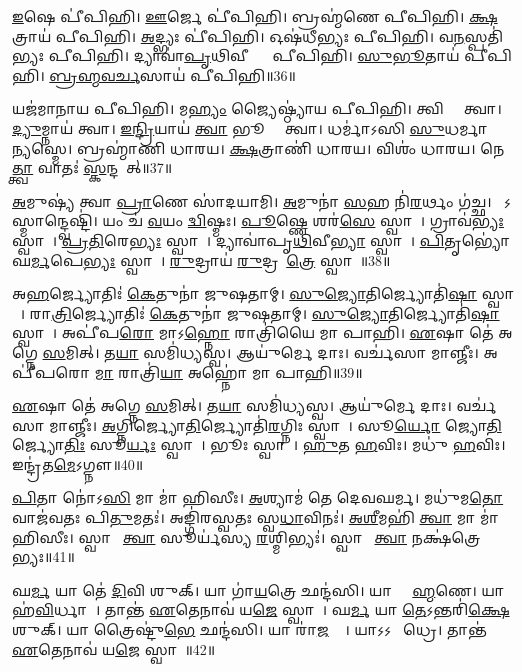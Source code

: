 \ul{𑌇}𑌷𑍇 𑌪𑍀॑𑌪𑌿𑌹𑌿। 
\ul{𑌊}𑌰𑍍𑌜𑍇 𑌪𑍀॑𑌪𑌿𑌹𑌿। 
𑌬𑍍𑌰𑌹𑍍𑌮॑𑌣𑍇 𑌪𑍀𑌪𑌿𑌹𑌿। 
\ul{𑌕𑍍𑌷}𑌤𑍍𑌰𑌾𑌯॑ 𑌪𑍀𑌪𑌿𑌹𑌿। 
\ul{𑌅}𑌦𑍍𑌭𑍍𑌯𑌃 𑌪𑍀॑𑌪𑌿𑌹𑌿। 
𑌓𑌷॑𑌧𑍀𑌭𑍍𑌯𑌃 𑌪𑍀𑌪𑌿𑌹𑌿। 
𑌵\ul{𑌨}𑌸𑍍𑌪𑌤𑌿॑𑌭𑍍𑌯𑌃 𑌪𑍀𑌪𑌿𑌹𑌿। 
𑌦𑍍𑌯𑌾𑌵𑌾॑\ul{𑌪𑍃}𑌥𑌿𑌵𑍀𑌭𑍍𑌯𑌾𑌂᳚ 𑌪𑍀𑌪𑌿𑌹𑌿। 
\ul{𑌸𑍁}\ul{𑌭𑍂}𑌤𑌾𑌯॑ 𑌪𑍀𑌪𑌿𑌹𑌿। 
\ul{𑌬𑍍𑌰}\ul{𑌹𑍍𑌮}\ul{𑌵}\ul{𑌰𑍍𑌚}𑌸𑌾𑌯॑ 𑌪𑍀𑌪𑌿𑌹𑌿॥36॥

𑌯𑌜॑𑌮𑌾𑌨𑌾𑌯 𑌪𑍀𑌪𑌿𑌹𑌿। 
𑌮\ul{𑌹𑍍𑌯𑌂} 𑌜𑍍𑌯𑍈𑌷𑍍𑌠𑍍𑌯𑌾॑𑌯 𑌪𑍀𑌪𑌿𑌹𑌿। 
𑌤𑍍𑌵𑌿𑌷𑍍𑌯𑍈᳚ 𑌤𑍍𑌵𑌾। 
\ul{𑌦𑍍𑌯𑍁}𑌮𑍍𑌨𑌾𑌯॑ 𑌤𑍍𑌵𑌾। 
\ul{𑌇}\ul{𑌨𑍍𑌦𑍍𑌰𑌿}𑌯𑌾𑌯॑ \ul{𑌤𑍍𑌵𑌾} 𑌭𑍂𑌤𑍍𑌯𑍈᳚ 𑌤𑍍𑌵𑌾। 
𑌧𑌰𑍍𑌮𑌾॑𑌽𑌸𑌿 \ul{𑌸𑍁}𑌧𑌰𑍍𑌮𑌾 𑌮𑍇᳚ \ul{𑌨𑍍𑌯}𑌸𑍍𑌮𑍇। 
𑌬𑍍𑌰𑌹𑍍𑌮𑌾॑𑌣𑌿 𑌧𑌾𑌰𑌯। 
\ul{𑌕𑍍𑌷}𑌤𑍍𑌰𑌾𑌣𑌿॑ 𑌧𑌾𑌰𑌯। 
𑌵𑌿𑌶𑌂॑ 𑌧𑌾𑌰𑌯। 
𑌨𑍇\ul{𑌤𑍍𑌤𑍍𑌵𑌾} 𑌵𑌾𑌤𑌃॑ \ul{𑌸𑍍𑌕}𑌨𑍍𑌦𑌯𑌾᳚𑌤𑍍॥37॥

\ul{𑌅}𑌮𑍁𑌷𑍍𑌯॑ 𑌤𑍍𑌵𑌾 \ul{𑌪𑍍𑌰𑌾}𑌣𑍇 𑌸𑌾॑𑌦𑌯𑌾𑌮𑌿। 
\ul{𑌅}𑌮𑍁𑌨𑌾॑ \ul{𑌸}𑌹 𑌨𑌿॑\ul{𑌰}𑌰𑍍𑌥𑌂 𑌗॑𑌚𑍍𑌛। 
𑌯𑍋᳚𑌽𑌸𑍍𑌮𑌾𑌨𑍍𑌦𑍍𑌵𑍇𑌷𑍍𑌟𑌿॑। 
𑌯𑌂 𑌚॑ \ul{𑌵}𑌯𑌂 \ul{𑌦𑍍𑌵𑌿}𑌷𑍍𑌮𑌃। 
\ul{𑌪𑍂}𑌷𑍍𑌣𑍇 𑌶𑌰॑\ul{𑌸𑍇} 𑌸𑍍𑌵𑌾𑌹𑌾᳚। 
𑌗𑍍𑌰𑌾𑌵॑\ul{𑌭𑍍𑌯𑌃} 𑌸𑍍𑌵𑌾𑌹𑌾᳚। 
\ul{𑌪𑍍𑌰}\ul{𑌤𑌿}𑌰𑍇\ul{𑌭𑍍𑌯𑌃} 𑌸𑍍𑌵𑌾𑌹𑌾᳚। 
𑌦𑍍𑌯𑌾𑌵𑌾॑𑌪𑍃\ul{𑌥𑌿}𑌵𑍀\ul{𑌭𑍍𑌯𑌾}\ul{} 𑌸𑍍𑌵𑌾𑌹𑌾᳚। 
\ul{𑌪𑌿}𑌤𑍃𑌭𑍍𑌯𑍋॑ 𑌘\ul{𑌰𑍍𑌮}𑌪𑍇\ul{𑌭𑍍𑌯𑌃} 𑌸𑍍𑌵𑌾𑌹𑌾᳚। 
\ul{𑌰𑍁}𑌦𑍍𑌰𑌾𑌯॑ \ul{𑌰𑍁}𑌦𑍍𑌰𑌹𑍋᳚\ul{𑌤𑍍𑌰𑍇} 𑌸𑍍𑌵𑌾𑌹𑌾᳚॥38॥

𑌅\ul{𑌹}𑌰𑍍𑌜𑍍𑌯𑍋𑌤𑌿𑌃॑ \ul{𑌕𑍇}𑌤𑍁𑌨𑌾॑ 𑌜𑍁𑌷𑌤𑌾𑌮𑍍। 
\ul{𑌸𑍁}\ul{𑌜𑍍𑌯𑍋}𑌤𑌿𑌰𑍍𑌜𑍍𑌯𑍋𑌤𑌿॑\ul{𑌷𑌾}\ul{} 𑌸𑍍𑌵𑌾𑌹𑌾᳚। 
𑌰𑌾\ul{𑌤𑍍𑌰𑌿}𑌰𑍍𑌜𑍍𑌯𑍋𑌤𑌿𑌃॑ \ul{𑌕𑍇}𑌤𑍁𑌨𑌾॑ 𑌜𑍁𑌷𑌤𑌾𑌮𑍍। 
\ul{𑌸𑍁}\ul{𑌜𑍍𑌯𑍋}𑌤𑌿𑌰𑍍𑌜𑍍𑌯𑍋𑌤𑌿॑\ul{𑌷𑌾}\ul{} 𑌸𑍍𑌵𑌾𑌹𑌾᳚। 
𑌅𑌪𑍀॑𑌪\ul{𑌰𑍋} 𑌮𑌾𑌽\ul{𑌹𑍍𑌨𑍋} 𑌰𑌾𑌤𑍍𑌰𑌿॑𑌯𑍈 𑌮𑌾 𑌪𑌾𑌹𑌿। 
\ul{𑌏}𑌷𑌾 𑌤𑍇॑ 𑌅𑌗𑍍𑌨𑍇 \ul{𑌸}𑌮𑌿𑌤𑍍। 
𑌤\ul{𑌯𑌾} 𑌸𑌮𑌿॑𑌧𑍍𑌯𑌸𑍍𑌵। 
𑌆𑌯𑍁॑𑌰𑍍𑌮𑍇 𑌦𑌾𑌃। 
𑌵𑌰𑍍𑌚॑𑌸𑌾 𑌮𑌾𑌞𑍍𑌜𑍀𑌃। 
𑌅𑌪𑍀॑𑌪𑌰𑍋 \ul{𑌮𑌾} 𑌰𑌾𑌤𑍍𑌰𑌿॑\ul{𑌯𑌾} 𑌅𑌹𑍍𑌨𑍋॑ 𑌮𑌾 𑌪𑌾𑌹𑌿॥39॥

\ul{𑌏}𑌷𑌾 𑌤𑍇॑ 𑌅𑌗𑍍𑌨𑍇 \ul{𑌸}𑌮𑌿𑌤𑍍। 
𑌤\ul{𑌯𑌾} 𑌸𑌮𑌿॑𑌧𑍍𑌯𑌸𑍍𑌵। 
𑌆𑌯𑍁॑𑌰𑍍𑌮𑍇 𑌦𑌾𑌃। 
𑌵𑌰𑍍𑌚॑𑌸𑌾 𑌮𑌾𑌞𑍍𑌜𑍀𑌃। 
\ul{𑌅}𑌗𑍍𑌨𑌿𑌰𑍍𑌜𑍍𑌯𑍋\ul{𑌤𑌿}𑌰𑍍𑌜𑍍𑌯𑍋𑌤𑌿॑\ul{𑌰}𑌗𑍍𑌨𑌿𑌃 𑌸𑍍𑌵𑌾𑌹𑌾᳚। 
𑌸𑍂\ul{𑌰𑍍𑌯𑍋} 𑌜𑍍𑌯𑍋\ul{𑌤𑌿}𑌰𑍍𑌜𑍍𑌯𑍋\ul{𑌤𑌿𑌃} 𑌸𑍂\ul{𑌰𑍍𑌯𑌃} 𑌸𑍍𑌵𑌾𑌹𑌾᳚। 
𑌭𑍂𑌃 𑌸𑍍𑌵𑌾𑌹𑌾᳚। 
\ul{𑌹𑍁}𑌤 \ul{𑌹}𑌵𑌿𑌃। 
𑌮𑌧𑍁॑ \ul{𑌹}𑌵𑌿𑌃। 
𑌇𑌨𑍍𑌦𑍍𑌰॑𑌤\ul{𑌮𑍇}𑌽𑌗𑍍𑌨𑍗॥40॥

\ul{𑌪𑌿}𑌤𑌾 𑌨𑍋॑𑌽\ul{𑌸𑌿} 𑌮𑌾 𑌮𑌾॑ 𑌹𑌿𑌸𑍀𑌃। 
\ul{𑌅}𑌶𑍍𑌯𑌾𑌮॑ 𑌤𑍇 𑌦𑍇𑌵𑌘𑌰𑍍𑌮। 
𑌮𑌧𑍁॑𑌮\ul{𑌤𑍋} 𑌵𑌾𑌜॑𑌵𑌤𑌃 𑌪𑌿\ul{𑌤𑍁}𑌮𑌤𑌃॑। 
𑌅𑌙𑍍𑌗𑌿॑𑌰𑌸𑍍𑌵𑌤𑌃 𑌸𑍍𑌵\ul{𑌧𑌾}𑌵𑌿𑌨𑌃॑। 
\ul{𑌅}\ul{𑌶𑍀}𑌮𑌹𑌿॑ \ul{𑌤𑍍𑌵𑌾} 𑌮𑌾 𑌮𑌾॑ 𑌹𑌿𑌸𑍀𑌃। 
𑌸𑍍𑌵𑌾𑌹𑌾᳚ \ul{𑌤𑍍𑌵𑌾} 𑌸𑍂𑌰𑍍𑌯॑𑌸𑍍𑌯 \ul{𑌰}𑌶𑍍𑌮𑌿𑌭𑍍𑌯𑌃॑। 
𑌸𑍍𑌵𑌾𑌹𑌾᳚ \ul{𑌤𑍍𑌵𑌾} 𑌨𑌕𑍍𑌷॑𑌤𑍍𑌰𑍇𑌭𑍍𑌯𑌃॥41॥
\anuvakamend[\ul{𑌬𑍍𑌰}\ul{𑌹𑍍𑌮}\ul{𑌵}\ul{𑌰𑍍𑌚}𑌸𑌾𑌯॑ 𑌪𑍀𑌪𑌿𑌹𑌿 \ul{𑌸𑍍𑌕}𑌨𑍍𑌦𑌯𑌾᳚\ul{𑌦𑍍𑌰𑍁}𑌦𑍍𑌰𑌾𑌯॑ \ul{𑌰𑍁}𑌦𑍍𑌰𑌹𑍋᳚\ul{𑌤𑍍𑌰𑍇} 𑌸𑍍𑌵𑌾𑌹𑌾𑌽𑌹𑍍𑌨𑍋॑ 𑌮𑌾 𑌪𑌾\ul{𑌹𑍍𑌯}𑌗𑍍𑌨𑍗 \ul{𑌸}𑌪𑍍𑌤 𑌚॑]

𑌘\ul{𑌰𑍍𑌮} 𑌯𑌾 𑌤𑍇॑ \ul{𑌦𑌿}𑌵𑌿 𑌶𑍁𑌕𑍍। 
𑌯𑌾 𑌗𑌾॑\ul{𑌯}𑌤𑍍𑌰𑍇 𑌛𑌨𑍍𑌦॑𑌸𑌿। 
𑌯𑌾 𑌬𑍍𑌰𑌾᳚\ul{𑌹𑍍𑌮}𑌣𑍇। 
𑌯𑌾 𑌹॑\ul{𑌵𑌿}𑌰𑍍𑌧𑌾𑌨𑍇᳚। 
𑌤𑌾𑌨𑍍𑌤॑ \ul{𑌏}𑌤𑍇𑌨𑌾𑌵॑ 𑌯\ul{𑌜𑍇} 𑌸𑍍𑌵𑌾𑌹𑌾᳚। 
𑌘\ul{𑌰𑍍𑌮} 𑌯𑌾 \ul{𑌤𑍇}𑌽𑌨𑍍𑌤𑌰𑌿॑\ul{𑌕𑍍𑌷𑍇} 𑌶𑍁𑌕𑍍। 
𑌯𑌾 𑌤𑍍𑌰𑍈𑌷𑍍𑌟𑍁॑\ul{𑌭𑍇} 𑌛𑌨𑍍𑌦॑𑌸𑌿। 
𑌯𑌾 𑌰𑌾॑\ul{𑌜}𑌨𑍍𑌯𑍇᳚। 
𑌯𑌾𑌽𑌽𑌗𑍍𑌨𑍀᳚𑌧𑍍𑌰𑍇। 
𑌤𑌾𑌨𑍍𑌤॑ \ul{𑌏}𑌤𑍇𑌨𑌾𑌵॑ 𑌯\ul{𑌜𑍇} 𑌸𑍍𑌵𑌾𑌹𑌾᳚॥42॥


